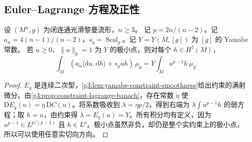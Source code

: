 \subsection{Euler–Lagrange 方程及正性}
\label{g3:subsec:2402:04}
\begin{proposition}\label{g3:prop:yamabe-euler-lagrange}
	设 \((M^n,g)\) 为闭连通光滑黎曼流形，\(n\ge3\)。
	记 \(p=2n/(n-2)\)。记 \(a_n=4(n-1)/(n-2)\)，\(s_g=\operatorname{Scal}_g\)。记 \(Y=Y(M,[g])\) 为 \([g]\) 的 Yamabe 常数。
	若 \(u\ge0\)、\(\|u\|_p=1\) 为 \(Y\) 的极小点，则对每个 \(h\in H^1(M)\)，
	\begin{equation}\label{g3:eq:yamabe-weak-equation}
		\int_M(a_n\langle\mathrm du,\mathrm dh\rangle+s_guh)\,\mu_g
		=Y\int_Mu^{p-1}h\,\mu_g.
	\end{equation}
\end{proposition}
\begin{proof}
	\(E_g\) 是连续二次型，\cref{g3:lem:yamabe-constraint-smoothness}给出约束的满射微分。由\cref{g3:prop:constraint-lagrange-banach}，存在常数 \(\eta\) 使 \(\mathrm DE_g(u)=\eta\,\mathrm DC(u)\)。将系数吸收到 \(\lambda=\eta p/2\)，得到右端为 \(\lambda\int u^{p-1}h\) 的弱方程；取 \(h=u\)，由约束得 \(\lambda=E_g(u)=Y\)。所有积分均有定义，因为 \(u^{p-1}\in L^{p/(p-1)}\) 且 \(h\in L^p\)。极小点虽然非负，却仍是整个实约束上的极小点，所以可以使用任意实切向方向。
\end{proof}

